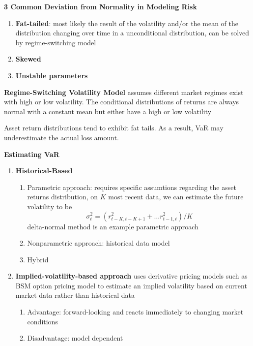 \documentclass[11pt,fleqn]{book} %
\numberwithin{equation}{section} %
\numberwithin{figure}{section} %
\numberwithin{table}{section} %
\begin{document}
\begin{definition}\textbf{3 Common Deviation from Normality in Modeling Risk}
\begin{enumerate}
    \item \textbf{Fat-tailed}: most likely the result of the volatility and/or the mean of the distribution changing over time in a unconditional distribution, can be solved by regime-switching model
    \item \textbf{Skewed}
    \item \textbf{Unstable parameters}
\end{enumerate}
\end{definition}
\begin{definition}\textbf{Regime-Switching Volatility Model} assumes different market regimes exist with high or low volatility. The conditional distributions of returns are always normal with a constant mean but either have a high or low volatility
\end{definition}
\begin{remark}
Asset return distributions tend to exhibit fat tails. As a result, VaR may underestimate the actual loss amount.
\end{remark}
\begin{definition}\textbf{Estimating VaR}
\begin{enumerate}
    \item \textbf{Historical-Based}
    \begin{enumerate}
        \item Parametric approach: requires specific assumtions regarding the asset returns distribution, on $K$ most recent data, we can estimate the future volatility to be
        $$
        \sigma_t^2=\left(r_{t-K,t-K+1}^2+\dots r_{t-1,t}^2\right)/K
        $$
        delta-normal method is an example parametric approach
        \item Nonparametric approach: historical data model
        \item Hybrid
    \end{enumerate}
    \item \textbf{Implied-volatility-based approach} uses derivative pricing models such as BSM option pricing model to estimate an implied volatility based on current market data rather than historical data
    \begin{enumerate}
        \item Advantage: forward-looking and reacts immediately to changing market conditions
        \item Disadvantage: model dependent
    \end{enumerate}
\end{enumerate}
\end{definition}
\end{document}
